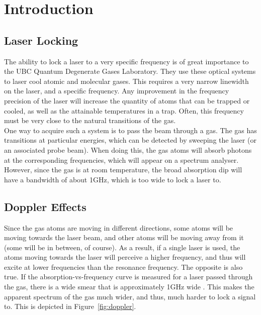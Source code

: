 \newpage
\section{Introduction}

\subsection{Laser Locking}

The ability to lock a laser to a very specific frequency is of great importance to the UBC Quantum Degenerate Gases Laboratory.  They use these optical systems to laser cool atomic and molecular gases.  This requires a very narrow linewidth on the laser, and a specific frequency.  Any improvement in the frequency precision of the laser will increase the quantity of atoms that can be trapped or cooled, as well as the attainable temperatures in a trap.  Often, this frequency must be very close to the natural transitions of the gas. \\

One way to acquire such a system is to pass the beam through a gas.  The gas has transitions at particular energies, which can be detected by sweeping the laser (or an associated probe beam).  When doing this, the gas atoms will absorb photons at the corresponding frequencies, which will appear on a spectrum analyser.  However, since the gas is at room temperature, the broad absorption dip will have a bandwidth of about 1GHz, which is too wide to lock a laser to.

\subsection{Doppler Effects}

Since the gas atoms are moving in different directions, some atoms will be moving towards the laser beam, and other atoms will be moving away from it (some will be in between, of course).  As a result, if a single laser is used, the atoms moving towards the laser will perceive a higher frequency, and thus will excite at lower frequencies than the resonance frequency.  The opposite is also true.  If the absorption-vs-frequency curve is measured for a laser passed through the gas, there is a wide smear that is approximately 1GHz wide \cite{madison14}.  This makes the apparent spectrum of the gas much wider, and thus, much harder to lock a signal to.  This is depicted in Figure~\ref{fig:doppler}. \\

